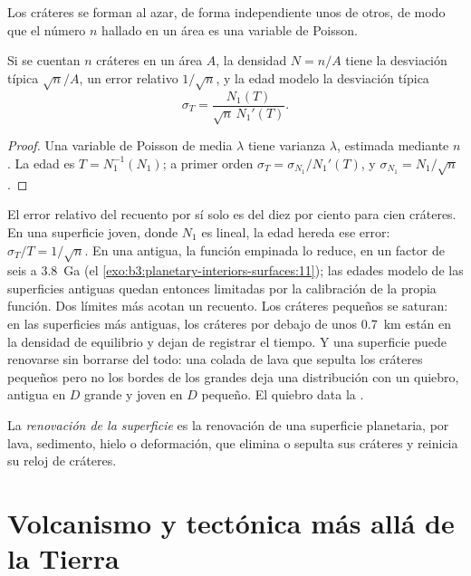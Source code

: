 Los cráteres se forman al azar, de forma independiente unos de otros, de modo que el número
$n$ hallado en un área es una variable de Poisson.

\begin{proposition}\label{prop:b3:planetary-interiors-surfaces:poisson}
Si se cuentan $n$ cráteres en un área $A$, la densidad $N = n/A$ tiene la
desviación típica $\sqrt n/A$, un error relativo $1/\sqrt n$, y la edad modelo
la desviación típica
\[
  \sigma_T = \frac{N_1(T)}{\sqrt n\,N_1'(T)} .
\]
\end{proposition}

\begin{proof}
Una variable de Poisson de media $\lambda$ tiene varianza $\lambda$, estimada mediante
$n$. La edad es $T = N_1^{-1}(N_1)$; a primer orden $\sigma_T =
\sigma_{N_1}/N_1'(T)$, y $\sigma_{N_1} = N_1/\sqrt n$.
\end{proof}

El error relativo del recuento por sí solo es del diez por ciento para cien
cráteres. En una superficie joven, donde $N_1$ es lineal, la edad hereda ese error:
$\sigma_T/T = 1/\sqrt n$. En una antigua, la función empinada lo reduce, en
un factor de seis a \qty{3.8}{Ga} (el \cref{exo:b3:planetary-interiors-surfaces:11});
las edades modelo de las superficies antiguas quedan entonces limitadas por la calibración
de la propia función. Dos límites más acotan un recuento. Los cráteres pequeños
se saturan: en las superficies más antiguas, los cráteres por debajo de unos \qty{0.7}{km} están en
la densidad de equilibrio y dejan de registrar el tiempo. Y una superficie puede renovarse
sin borrarse del todo: una colada de lava que sepulta los cráteres pequeños pero no los
bordes de los grandes deja una distribución con un quiebro, antigua en $D$ grande y
joven en $D$ pequeño. El quiebro data la .

\begin{definition}\label{def:b3:planetary-interiors-surfaces:resurfacing}
La \emph{renovación de la superficie} es la renovación de una
superficie planetaria, por lava, sedimento, hielo o deformación, que elimina o sepulta sus
cráteres y reinicia su reloj de cráteres.
\end{definition}

\section{Volcanismo y tectónica más allá de la Tierra}\label{sec:b3:planetary-interiors-surfaces:volcanism}

